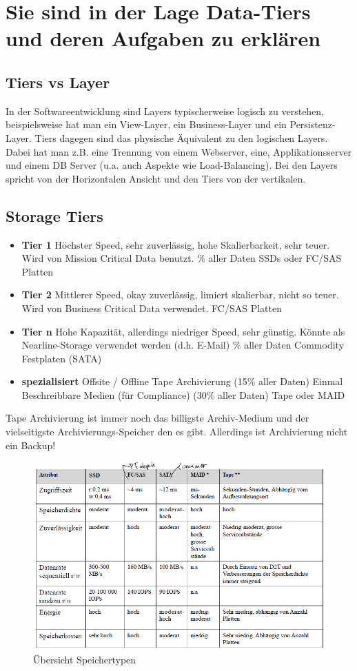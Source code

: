 \section{Sie sind in der Lage Data-Tiers und deren Aufgaben zu erklären}
\subsection{Tiers vs Layer}
In der Softwareentwicklung sind Layers typischerweise logisch zu verstehen, beispielsweise hat man ein View-Layer, ein Business-Layer und ein Persistenz-Layer. Tiers dagegen sind das physische Äquivalent zu den logischen Layers. Dabei hat man z.B. eine Trennung von einem Webserver, eine, Applikationsserver und einem DB Server (u.a. auch Aspekte wie Load-Balancing). Bei den Layers spricht von der Horizontalen Ansicht und den Tiers von der vertikalen.
\subsection{Storage Tiers}\label{sec:storagetier}
\begin{itemize}
	\item \textbf{Tier 1}
		\subitem Höchster Speed, sehr zuverlässig, hohe Skalierbarkeit, sehr teuer. Wird von Mission Critical Data benutzt.
		\% aller Daten 
		\subitem SSDs oder FC/SAS Platten
	\item \textbf{Tier 2}
		\subitem Mittlerer Speed, okay zuverlässig, limiert skalierbar, nicht so teuer. Wird von Business Critical Data verwendet.
		\subitem FC/SAS Platten
	\item \textbf{Tier n}
		\subitem Hohe Kapazität, allerdings niedriger Speed, sehr günstig. Könnte als Nearline-Storage verwendet werden (d.h. E-Mail)
		\% aller Daten
		\subitem Commodity Festplaten (SATA)
	\item \textbf{spezialisiert}
		\subitem Offsite / Offline Tape Archivierung (15\% aller Daten)
		\subitem Einmal Beschreibbare Medien (für Compliance) (30\% aller Daten)
		\subitem Tape oder MAID
\end{itemize}
Tape Archivierung ist immer noch das billigste Archiv-Medium und der vielseitigste Archivierungs-Speicher den es gibt. Allerdings ist Archivierung nicht ein Backup!
\begin{figure}
	\centering
	\includegraphics[width=0.9\linewidth]{fig/speichertypen}
	\caption{Übersicht Speichertypen}
	\label{fig:speichertypen}
\end{figure}
